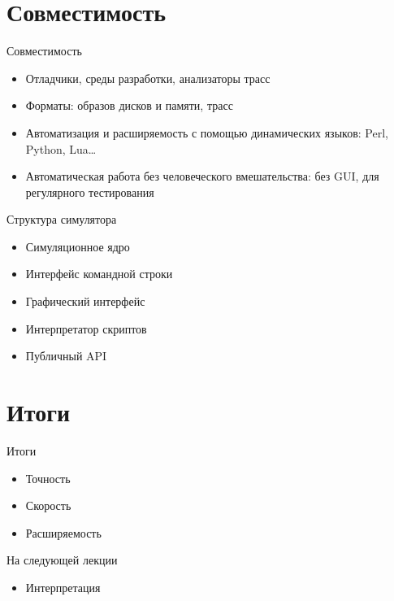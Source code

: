 \documentclass{beamer}
\begin{document}
\section{Совместимость}

\begin{frame}{Совместимость}
\begin{itemize}
\item Отладчики, среды разработки, анализаторы трасс
\item Форматы: образов дисков и памяти, трасс
\item Автоматизация и расширяемость с помощью динамических языков: Perl, Python, Lua\dots
\item Автоматическая работа без человеческого вмешательства: без GUI, для регулярного тестирования
\end{itemize}
\end{frame}

\begin{frame}{Структура симулятора}
\begin{itemize}
\item Симуляционное ядро
\item Интерфейс командной строки
\item Графический интерфейс
\item Интерпретатор скриптов
\item Публичный API
\end{itemize}
\end{frame}

\section{Итоги}

\begin{frame}{Итоги}
\begin{itemize}
\item Точность
\item Скорость
\item Расширяемость
\end{itemize}
\end{frame}

\begin{frame}{На следующей лекции}
\begin{itemize}
\item Интерпретация
\end{itemize}
\end{frame}

\end{document}
